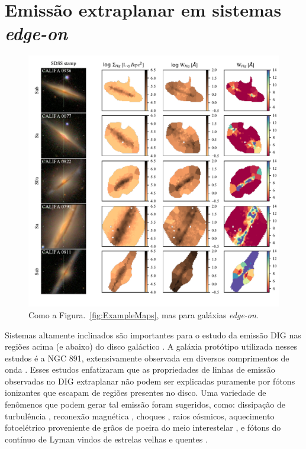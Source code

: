 \section{Emissão extraplanar em sistemas {\em edge-on}}
\label{sec:DIGdisc:edgeon}

\begin{figure}
 \includegraphics{figuras/fig_maps_class_edgeon_paper.pdf}
 \caption[Imagem \SDSS e mapas de $\Sigma_{{\rm H}\alpha}$ e $W_{{\rm H}\alpha}$: sistemas {\em edge-on}]
 {Como a Figura.\ \ref{fig:ExampleMaps}, mas para galáxias {\em edge-on}.}
 \label{fig:ExampleMapsEdgeOn}
\end{figure}

Sistemas altamente inclinados são importantes para o estudo da emissão DIG nas regiões acima (e abaixo) do disco galáctico \citep{Tullmann.and.Dettmar.2000, Otte.etal.2002, Jones.etal.2017}. A galáxia protótipo utilizada nesses estudos é a NGC 891, extensivamente observada em diversos comprimentos de onda \citep{Rand.1998, Hodges.and.Bregman.2013, Seon.etal.2014, Hughes.etal.2015}. Esses estudos enfatizaram que as propriedades de linhas de emissão observadas no DIG extraplanar não podem ser explicadas puramente por fótons ionizantes que escapam de regiões \hii presentes no disco. Uma variedade de fenômenos que podem  gerar tal emissão foram sugeridos, como: dissipação de turbulência \citep{Minter.and.Spangler.1997}, reconexão magnética \citep{Raymond.1992}, choques \citep{CollinsRand.2001}, raios cósmicos, aquecimento fotoelétrico proveniente de grãos de poeira do meio interestelar  \citep{Weingartner.and.Draine.2001}, e fótons do contínuo de Lyman vindos de estrelas velhas e quentes \citep{FloresFajardo.etal.2011a}.

